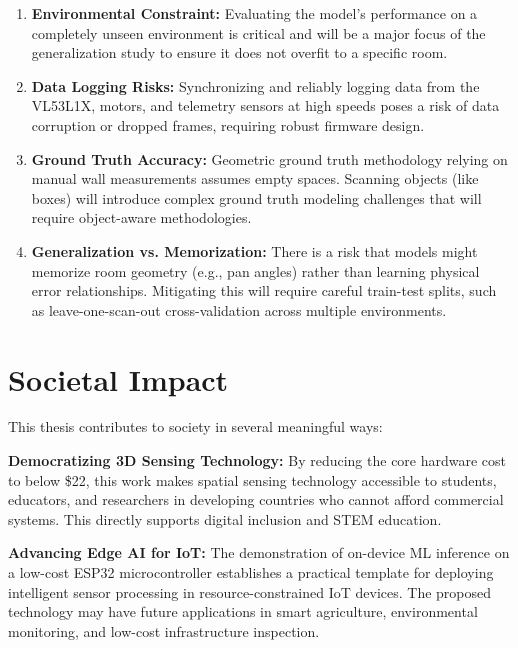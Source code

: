 \documentclass[12pt,a4paper]{article}
\begin{document}
    \begin{enumerate}[leftmargin=0.35in]
        \item \textbf{Environmental Constraint:} Evaluating the model's performance on a completely unseen environment is critical and will be a major focus of the generalization study to ensure it does not overfit to a specific room.

        \item \textbf{Data Logging Risks:} Synchronizing and reliably logging data from the VL53L1X, motors, and telemetry sensors at high speeds poses a risk of data corruption or dropped frames, requiring robust firmware design.

        \item \textbf{Ground Truth Accuracy:} Geometric ground truth methodology relying on manual wall measurements assumes empty spaces. Scanning objects (like boxes) will introduce complex ground truth modeling challenges that will require object-aware methodologies.

        \item \textbf{Generalization vs. Memorization:} There is a risk that models might memorize room geometry (e.g., pan angles) rather than learning physical error relationships. Mitigating this will require careful train-test splits, such as leave-one-scan-out cross-validation across multiple environments.
    \end{enumerate}



    \section{Societal Impact}

    This thesis contributes to society in several meaningful ways:

    \textbf{Democratizing 3D Sensing Technology:} By reducing the core hardware cost to below \$22, this work makes spatial sensing technology accessible to students, educators, and researchers in developing countries who cannot afford commercial systems. This directly supports digital inclusion and STEM education.

    \textbf{Advancing Edge AI for IoT:} The demonstration of on-device ML inference on a low-cost ESP32 microcontroller establishes a practical template for deploying intelligent sensor processing in resource-constrained IoT devices. The proposed technology may have future applications in smart agriculture, environmental monitoring, and low-cost infrastructure inspection.
\end{document}
